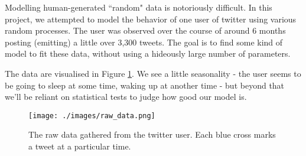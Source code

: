 Modelling human-generated ``random" data is notoriously difficult. In this project, we attempted to model the behavior of one user of twitter using various random processes. The user was observed over the course of around 6 months posting (emitting) a little over 3,300 tweets. The goal is to find some kind of model to fit these data, without using a hideously large number of parameters.

The data are visualised in Figure \ref{raw_data}. We see a little seasonality - the user seems to be going to sleep at some time, waking up at another time - but beyond that we'll be reliant on statistical tests to judge how good our model is.

\begin{figure}[h]
\texttt{[image: ./images/raw\_data.png]}
\caption{The raw data gathered from the twitter user. Each blue cross marks a tweet at a particular time.}
\label{raw_data}
\end{figure}